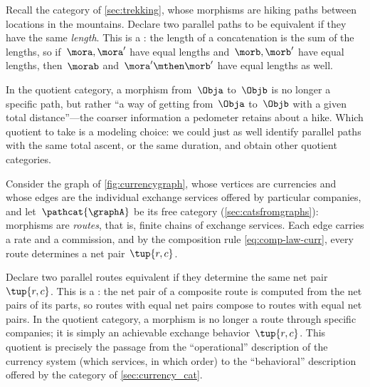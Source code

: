 \begin{example}
    \label{exa:quotient-cat-berg}
    Recall the category \Berg of \cref{sec:trekking}, whose morphisms are hiking paths between locations in the mountains.
    Declare two parallel paths to be equivalent if they have the same \emph{length}.
    This is a : the length of a concatenation is the sum of the lengths, so if~$\mora, \mora'$ have equal lengths and~$\morb, \morb'$ have equal lengths, then~$\morab$ and~$\mora' \mthen \morb'$ have equal lengths as well.

    In the quotient category, a morphism from~$\Obja$ to~$\Objb$ is no longer a specific path, but rather ``a way of getting from~$\Obja$ to~$\Objb$ with a given total distance''---the coarser information a pedometer retains about a hike.
    Which quotient to take is a modeling choice: we could just as well identify parallel paths with the same total ascent, or the same duration, and obtain other quotient categories.
\end{example}

\begin{example}
    \label{exa:quotient-cat-currency}
    Consider the graph of \cref{fig:currencygraph}, whose vertices are currencies and whose edges are the individual exchange services offered by particular companies, and let~$\pathcat{\graphA}$ be its free category (\cref{sec:catsfromgraphs}): morphisms are \emph{routes}, that is, finite chains of exchange services.
    Each edge carries a rate and a commission, and by the composition rule \cref{eq:comp-law-curr}, every route determines a net pair~$\tup{r, c}$.

    Declare two parallel routes equivalent if they determine the same net pair~$\tup{r,c}$.
    This is a : the net pair of a composite route is computed from the net pairs of its parts, so routes with equal net pairs compose to routes with equal net pairs.
    In the quotient category, a morphism is no longer a route through specific companies; it is simply an achievable exchange behavior~$\tup{r,c}$.
    This quotient is precisely the passage from the ``operational'' description of the currency system (which services, in which order) to the ``behavioral'' description offered by the category \Curr of \cref{sec:currency_cat}.
\end{example}


